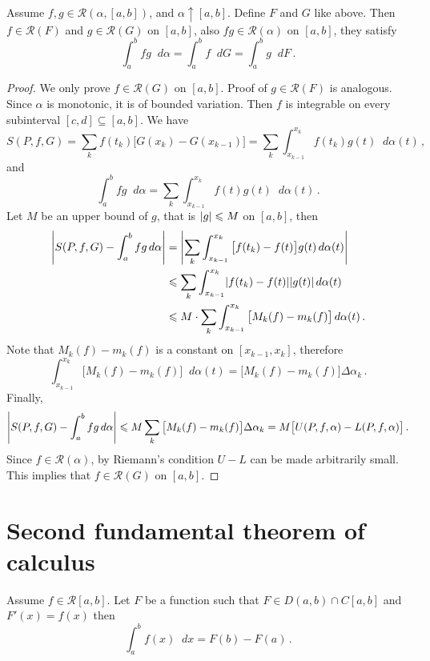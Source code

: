 \documentclass{article}
\newcommand{\Riemann}{\mathcal R}
\DeclarePairedDelimiter\abs{\lvert}{\rvert}
\newcommand{\dd}{\mathop{}\!d}
\newcommand{\increasing}{\uparrow}
\begin{document}
\begin{theorem} \label{thm:move-right}
    Assume $ f, g \in \Riemann(\alpha, [a, b]) $, and $ \alpha \increasing [a, b] $. Define $ F $ and $ G $ like above. Then $ f \in \Riemann(F) $ and $ g \in \Riemann(G) $ on $ [a, b] $, also $ fg \in \Riemann(\alpha) $ on $ [a, b] $, they satisfy
    \[ 
        \int_a^b fg \dd \alpha = \int_a^b f \dd G = \int_a^b g \dd F \,.    
    \]
\end{theorem}

\begin{proof} We only prove $ f \in \Riemann(G) $ on $ [a, b] $. Proof of $ g \in \Riemann(F) $ is analogous. Since $ \alpha $ is monotonic, it is of bounded variation. Then $ f $ is integrable on every subinterval $ [c, d] \subseteq [a, b] $. We have
    \[ 
        S(P, f, G) = \sum_{k} f(t_k) \big[ G(x_k) - G(x_{k-1}) \big] = \sum_{k} \int_{x_{k-1}}^{x_k} f(t_k) g(t) \dd \alpha(t) \,,
    \]
    and
    \[ 
        \int_a^b f g \dd \alpha = \sum_{k} \int_{x_{k-1}}^{x_k} f(t) g(t) \dd \alpha(t) \,.
    \]
    Let $ M $ be an upper bound of $ g $, that is $ \abs{ g } \leqslant M $ on $ [a, b] $, then
    \begin{align*}
        \abs*{ S(P, f, G) - \int_a^b fg \dd \alpha } &= \abs*{ \sum_{k} \int_{x_{k-1}}^{x_k} \big[ f(t_k) - f(t) \big] g(t) \dd \alpha(t) } \\
        &\leqslant \sum_{k} \int_{x_{k-1}}^{x_k} \abs{f(t_k) - f(t)} \abs{g(t)} \dd \alpha(t) \\
        &\leqslant M \cdot \sum_{k} \int_{x_{k-1}}^{x_k} \big[ M_k(f) - m_k(f) \big] \dd \alpha(t) \,.
    \end{align*}
    Note that $ M_k(f) - m_k(f) $ is a constant on $ [x_{k-1}, x_k] $, therefore
    \[ 
        \int_{x_{k-1}}^{x_k} \big[ M_k(f) - m_k(f) \big] \dd \alpha(t) = \big[ M_k(f) - m_k(f) \big] \Delta \alpha_k \,.
    \]
    Finally,
    \[ 
        \abs*{ S(P, f, G) - \int_a^b fg \dd \alpha } \leqslant M \sum_{k} \big[ M_k(f) - m_k(f) \big] \Delta \alpha_k = M \big[ U(P, f, \alpha) - L(P, f, \alpha) \big] \,.
    \]
    Since $ f \in \Riemann(\alpha) $, by Riemann's condition $ U - L $ can be made arbitrarily small. This implies that $ f \in \Riemann(G) $ on $ [a, b] $.
\end{proof}

\section{Second fundamental theorem of calculus}
\begin{theorem}
    Assume $ f \in \Riemann[a, b] $. Let $ F $ be a function such that $ F \in D(a, b) \cap C[a, b] $ and $ F'(x) = f(x) $ then
    \[ 
        \int_a^b f(x) \dd x = F(b) - F(a) \,.
    \]
\end{theorem}
\end{document}
